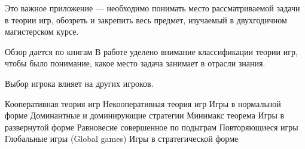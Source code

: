 Это важное приложение — необходимо понимать место рассматриваемой задачи в теории игр, обозреть и закрепить весь предмет, изучаемый в двухгодичном магистерском курсе.

Обзор дается по книгам \cite{nisan}
В работе уделено внимание классификации теории игр, чтобы было понимание, какое место задача занимает в отрасли знания.

Выбор игрока влияет на других игроков.

Кооперативная теория игр
Некооперативная теория игр
Игры в нормальной форме
Доминантные и доминирующие стратегии
Минимакс теорема
Игры в развернутой форме
Равновесие совершенное по подыграм
Повторяющиеся игры
Глобальные игры (Global games)
Игры в стратегической форме